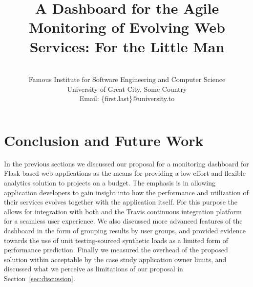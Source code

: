 \documentclass[conference]{IEEEtran}
\begin{document}
	

%
\title{A Dashboard for the Agile Monitoring of Evolving Web Services: For the Little Man}

\author{
\\
Famous Institute for Software Engineering and Computer Science\\
University of Great City, Some Country\\
Email: \{first.last\}@university.to 
}


\maketitle



















% 






\section{Conclusion and Future Work}
\label{sec:conclusions}

In the previous sections we discussed our proposal for a monitoring dashboard for Flask-based web applications as the means for providing a low effort and flexible analytics solution to projects on a budget. The emphasis is in allowing application developers to gain insight into how the performance and utilization of their services evolves together with the application itself. For this purpose the \tool allows for integration with both \git and the Travis continuous integration platform for a seamless user experience. We also discussed more advanced features of the dashboard in the form of grouping results by user groups, and provided evidence towards the use of unit testing-sourced synthetic loads as a limited form of performance prediction. Finally we measured the overhead of the proposed solution within acceptable by the case study application owner limits, and discussed what we perceive as limitations of our proposal in Section~\ref{sec:discussion}.
\end{document}
